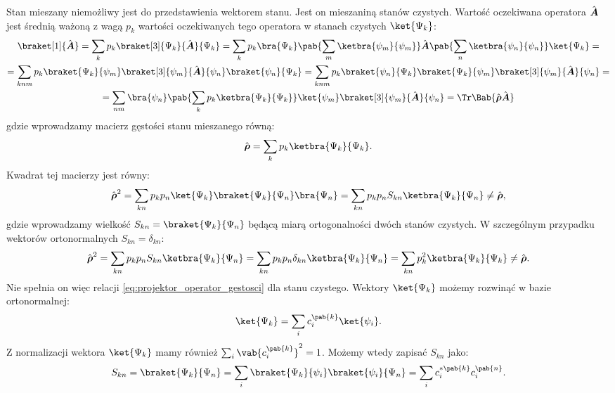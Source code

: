 Stan mieszany niemożliwy jest do przedstawienia wektorem stanu. Jest on mieszaniną stanów czystych. Wartość oczekiwana operatora \(\vu{A}\) jest średnią ważoną z wagą \(p_k\) wartości oczekiwanych tego operatora w stanach czystych \(\ket{\Psi_k}\):
\begin{multline}\label{eq:wart_ocz_macierz_mieszany}
	\braket[1]{\vu{A}} =
	\sum_k p_k \braket[3]{\Psi_k}{\vu{A}}{\Psi_k} =
	\sum_k p_k \bra{\Psi_k} \pab{\sum_m \ketbra{\psi_m}{\psi_m}} \vu{A} \pab{\sum_n \ketbra{\psi_n}{\psi_n}} \ket{\Psi_k} = \\ =
	\sum_{knm} p_k \braket{\Psi_k}{\psi_m} \braket[3]{\psi_m}{\vu{A}}{\psi_n} \braket{\psi_n}{\Psi_k} =
	\sum_{knm} p_k \braket{\psi_n}{\Psi_k} \braket{\Psi_k}{\psi_m} \braket[3]{\psi_m}{\vu{A}}{\psi_n} = \\ =
	\sum_{nm} \bra{\psi_n} \pab{\sum_{k} p_k \ketbra{\Psi_k}{\Psi_k}} \ket{\psi_m} \braket[3]{\psi_m}{\vu{A}}{\psi_n} =
	\Tr\Bab{\vu{\rho}\vu{A}}
\end{multline}
gdzie wprowadzamy macierz gęstości stanu mieszanego równą:
\begin{equation}\label{eq:macierz_gestosci_mieszany}
	\vu{\rho} = \sum_k p_k \ketbra{\Psi_k}{\Psi_k}.
\end{equation}
Kwadrat tej macierzy jest równy:
\begin{equation}\label{eq:macierz_gestosci_mieszany_kwadrat}
	\vu{\rho}^2 =
	\sum_{kn} p_k p_n \ket{\Psi_k}\braket{\Psi_k}{\Psi_n}\bra{\Psi_n} =
	\sum_{kn} p_k p_n S_{kn} \ketbra{\Psi_k}{\Psi_n} \neq \vu{\rho},
\end{equation}
gdzie wprowadzamy wielkość \(S_{kn} = \braket{\Psi_k}{\Psi_n}\) będącą miarą ortogonalności dwóch stanów czystych. W szczególnym przypadku wektorów ortonormalnych \(S_{kn} = \delta_{kn}\):
\begin{equation}
	\vu{\rho}^2 =
	\sum_{kn} p_k p_n S_{kn} \ketbra{\Psi_k}{\Psi_n} =
	\sum_{kn} p_k p_n \delta_{kn} \ketbra{\Psi_k}{\Psi_n} =
	\sum_{kn} p_k^2 \ketbra{\Psi_k}{\Psi_k} \neq \vu{\rho}.
\end{equation}
Nie spełnia on więc relacji \eqref{eq:projektor_operator_gestosci} dla stanu czystego. Wektory \(\ket{\Psi_k}\) możemy rozwinąć w bazie ortonormalnej:
\begin{equation}
	\ket{\Psi_k} = \sum_{i} c_{i}^{\pab{k}} \ket{\psi_i}.
\end{equation}
Z normalizacji wektora \(\ket{\Psi_k}\) mamy również \(\sum_{i} \vab{c_{i}^{\pab{k}}}^2 = 1\). Możemy wtedy zapisać \(S_{kn}\) jako:
\begin{equation}
	S_{kn} = \braket{\Psi_k}{\Psi_n} = \sum_{i} \braket{\Psi_k}{\psi_i} \braket{\psi_i}{\Psi_n} =
	\sum_{i} c_{i}^{*\pab{k}} c_{i}^{\pab{n}}.
\end{equation}
